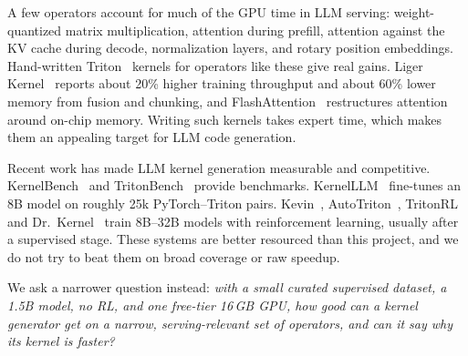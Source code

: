 \documentclass[11pt]{article}
\begin{document}
A few operators account for much of the GPU time in LLM serving: weight-quantized
matrix multiplication, attention during prefill, attention against the KV cache during decode,
normalization layers, and rotary position embeddings. Hand-written Triton~\cite{tillet2019triton}
kernels for operators like these give real gains. Liger Kernel~\cite{hsu2024liger} reports
about 20\% higher training throughput and about 60\% lower memory from fusion and chunking,
and FlashAttention~\cite{dao2022flashattention,dao2024flashattention2} restructures attention around
on-chip memory. Writing such kernels takes expert time, which makes them an appealing
target for LLM code generation.

Recent work has made LLM kernel generation measurable and competitive.
KernelBench~\cite{ouyang2025kernelbench} and TritonBench~\cite{li2025tritonbench} provide benchmarks.
KernelLLM~\cite{fisches2025kernelllm} fine-tunes an 8B model on roughly 25k PyTorch--Triton pairs.
Kevin~\cite{baronio2025kevin}, AutoTriton~\cite{li2025autotriton}, TritonRL~\cite{woo2025tritonrl} and
Dr.~Kernel~\cite{liu2026drkernel} train 8B--32B models with reinforcement learning, usually after a
supervised stage. These systems are better resourced than this project, and we do not try to
beat them on broad coverage or raw speedup.

We ask a narrower question instead: \emph{with a small curated supervised dataset, a 1.5B model,
no RL, and one free-tier 16\,GB GPU, how good can a kernel generator get on a narrow,
serving-relevant set of operators, and can it say why its kernel is faster?}
\end{document}
